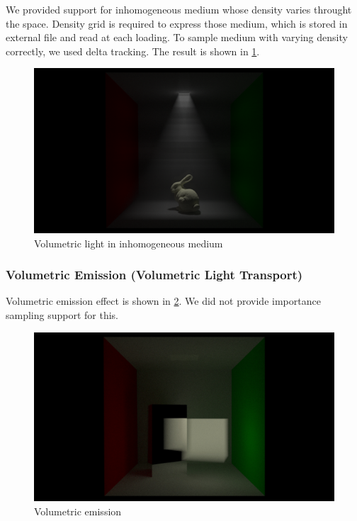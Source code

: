 \documentclass[acmtog]{acmart}
\begin{document}
We provided support for inhomogeneous medium whose density varies throught the space. Density grid is required to express those medium, which is stored in external file and read at each loading. To sample medium with varying density correctly, we used delta tracking. The result is shown in \ref{inhomo_vol}.

\begin{figure}[h]
	\centering	
	\includegraphics[width=\linewidth]{inhomo_vol}
	\caption{Volumetric light in inhomogeneous medium}
	\label{inhomo_vol}
\end{figure}

\subsubsection{Volumetric Emission (Volumetric Light Transport)}

Volumetric emission effect is shown in \ref{vol_emission}. We did not provide importance sampling support for this.

\begin{figure}[h]
	\centering	
	\includegraphics[width=\linewidth]{vol_emission}
	\caption{Volumetric emission}
	\label{vol_emission}
\end{figure}
\end{document}
